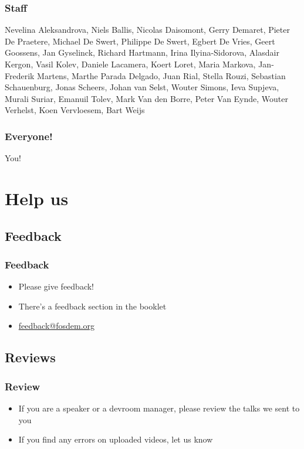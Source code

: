 \documentclass[t]{beamer}
\begin{document}
\begin{frame}
	\frametitle{Staff}
	\vfill
	Nevelina Aleksandrova, Niels Ballis, Nicolas Daisomont, Gerry Demaret, Pieter De Praetere, Michael De Swert, Philippe De Swert, Egbert De Vries, Geert Goossens, Jan Gyselinck, Richard Hartmann, Irina Ilyina-Sidorova, Alasdair Kergon, Vasil Kolev, Daniele Lacamera, Koert Loret, Maria Markova, Jan-Frederik Martens, Marthe Parada Delgado, Juan Rial, Stella Rouzi, Sebastian Schauenburg, Jonas Scheers, Johan van Selst, Wouter Simons, Ieva Supjeva, Murali Suriar, Emanuil Tolev, Mark Van den Borre, Peter Van Eynde, Wouter Verhelst, Koen Vervloesem, Bart Weijs
	\vfill
\end{frame}

\begin{frame}
	\frametitle{Everyone!}
	\vfill
	\begin{center}
	{\Huge You!}
	\end{center}
	\vfill
\end{frame}


\section{Help us}

\subsection{Feedback}

\begin{frame}
	\frametitle{Feedback}
	\vfill
	\begin{itemize}
		\item Please give feedback!
		\item There's a feedback section in the booklet
		\item \url{feedback@fosdem.org}
	\end{itemize}
	\vfill
\end{frame}

\subsection{Reviews}

\begin{frame}
	\frametitle{Review}
	\vfill
	\begin{itemize}
		\item If you are a speaker or a devroom manager, please review the talks we sent to you
		\item If you find any errors on uploaded videos, let us know
	\end{itemize}
	\vfill
\end{frame}
\end{document}
